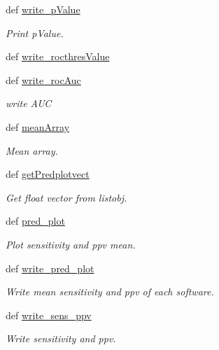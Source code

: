 \begin{DoxyCompactItemize}
def \hyperlink{classMycarn__stat_1_1Draw__data_1_1draw__data_a848adfe44649f97ad1a68c9e02c91c73}{write\-\_\-p\-Value}
\begin{DoxyCompactList}\small\item\em \-Print p\-Value. \end{DoxyCompactList}\item 
def \hyperlink{classMycarn__stat_1_1Draw__data_1_1draw__data_a91a8df7d1ad4d53abab74a7483aaddbe}{write\-\_\-rocthres\-Value}
\item 
def \hyperlink{classMycarn__stat_1_1Draw__data_1_1draw__data_a5114b857843f4cf998f732f5a2dcc466}{write\-\_\-roc\-Auc}
\begin{DoxyCompactList}\small\item\em write \-A\-U\-C \end{DoxyCompactList}\item 
def \hyperlink{classMycarn__stat_1_1Draw__data_1_1draw__data_a439b799218a9d8679afa5341a5aa0286}{mean\-Array}
\begin{DoxyCompactList}\small\item\em \-Mean array. \end{DoxyCompactList}\item 
def \hyperlink{classMycarn__stat_1_1Draw__data_1_1draw__data_a919d813ab587912f0a2c52d4589d1a3b}{get\-Predplotvect}
\begin{DoxyCompactList}\small\item\em \-Get float vector from listobj. \end{DoxyCompactList}\item 
def \hyperlink{classMycarn__stat_1_1Draw__data_1_1draw__data_aa4fb783b84f4a2a529c0ca0e268fd765}{pred\-\_\-plot}
\begin{DoxyCompactList}\small\item\em \-Plot sensitivity and ppv mean. \end{DoxyCompactList}\item 
def \hyperlink{classMycarn__stat_1_1Draw__data_1_1draw__data_a112e1af9c4820ce9ef382cbdbd540e06}{write\-\_\-pred\-\_\-plot}
\begin{DoxyCompactList}\small\item\em \-Write mean sensitivity and ppv of each software. \end{DoxyCompactList}\item 
def \hyperlink{classMycarn__stat_1_1Draw__data_1_1draw__data_a0580077630b022e5a0bc9c01659bbffe}{write\-\_\-sens\-\_\-ppv}
\begin{DoxyCompactList}\small\item\em \-Write sensitivity and ppv. \end{DoxyCompactList}\item 

\end{DoxyCompactItemize}
